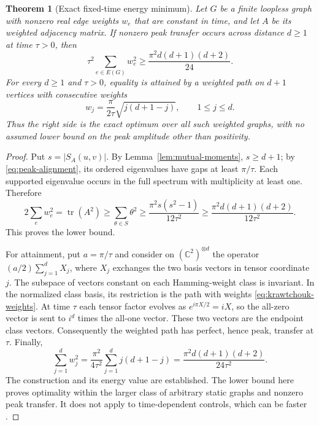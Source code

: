 \documentclass[11pt,a4paper]{article}
\newtheorem{theorem}{Theorem}
\theoremstyle{definition}\newtheorem{definition}[lemma]{Definition}
\theoremstyle{remark}\newtheorem{remark}[lemma]{Remark}
\begin{document}
\begin{theorem}[Exact fixed-time energy minimum]\label{thm:peak-energy}
Let $G$ be a finite loopless graph with nonzero real edge weights $w_e$
that are constant in time, and let $A$ be its weighted adjacency matrix. If nonzero peak transfer
occurs across distance $d\geq1$ at time $\tau>0$, then
\begin{equation}\label{eq:peak-energy-bound}
 \tau^2\sum_{e\in E(G)}w_e^2
      \geq \frac{\pi^2d(d+1)(d+2)}{24}.
\end{equation}
For every $d\geq1$ and $\tau>0$, equality is attained by a weighted path
on $d+1$ vertices with consecutive weights
\begin{equation}\label{eq:krawtchouk-weights}
 w_j=\frac{\pi}{2\tau}\sqrt{j(d+1-j)},\qquad 1\leq j\leq d.
\end{equation}
Thus the right side is the exact optimum over all such weighted graphs,
with no assumed lower bound on the peak amplitude other than positivity.
\end{theorem}
\begin{proof}
Put $s=|S_A(u,v)|$. By Lemma~\ref{lem:mutual-moments}, $s\geq d+1$;
by \eqref{eq:peak-alignment}, its ordered eigenvalues have gaps at least
$\pi/\tau$. Each supported eigenvalue occurs in the full spectrum with
multiplicity at least one. Therefore
\[
 2\sum_ew_e^2=\operatorname{tr}(A^2)
 \geq\sum_{\theta\in S}\theta^2
 \geq\frac{\pi^2s(s^2-1)}{12\tau^2}
 \geq\frac{\pi^2d(d+1)(d+2)}{12\tau^2}.
\]
This proves the lower bound.

For attainment, put $a=\pi/\tau$ and consider on $(\mathbb C^2)^{\otimes d}$
the operator $(a/2)\sum_{j=1}^d X_j$, where $X_j$ exchanges the two
basis vectors in tensor coordinate $j$. The subspace of vectors constant
on each Hamming-weight class is invariant. In the normalized class basis,
its restriction is the path with weights \eqref{eq:krawtchouk-weights}.
At time $\tau$ each tensor factor evolves as
$e^{i\pi X/2}=iX$, so the all-zero vector is sent to $i^d$ times the
all-one vector. These two vectors are the endpoint class vectors.
Consequently the weighted path has perfect, hence peak, transfer at
$\tau$. Finally,
\[
 \sum_{j=1}^d w_j^2
   =\frac{\pi^2}{4\tau^2}\sum_{j=1}^d j(d+1-j)
   =\frac{\pi^2d(d+1)(d+2)}{24\tau^2}.
\]
The construction and its energy value are established. The lower bound
here proves optimality within the larger class of arbitrary static graphs
and nonzero peak transfer. It does not apply to time-dependent controls,
which can be faster \cite{Stepanenko25}.
\end{proof}
\end{document}
